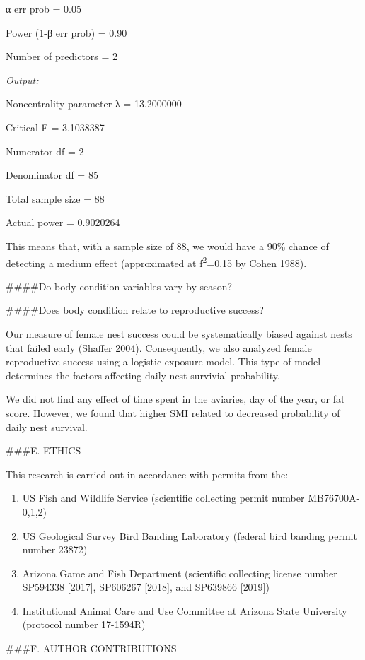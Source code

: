 \documentclass[
]{article}
\providecommand{\tightlist}{%
  \setlength{\itemsep}{0pt}\setlength{\parskip}{0pt}}
\begin{document}
α err prob = 0.05

Power (1-β err prob) = 0.90

Number of predictors = 2

\emph{Output:}

Noncentrality parameter λ = 13.2000000

Critical F = 3.1038387

Numerator df = 2

Denominator df = 85

Total sample size = 88

Actual power = 0.9020264

This means that, with a sample size of 88, we would have a 90\% chance
of detecting a medium effect (approximated at f\textsuperscript{2}=0.15
by Cohen 1988).

\#\#\#\#Do body condition variables vary by season?

\#\#\#\#Does body condition relate to reproductive success?

Our measure of female nest success could be systematically biased
against nests that failed early (Shaffer 2004). Consequently, we also
analyzed female reproductive success using a logistic exposure model.
This type of model determines the factors affecting daily nest survivial
probability.

We did not find any effect of time spent in the aviaries, day of the
year, or fat score. However, we found that higher SMI related to
decreased probability of daily nest survival.

\#\#\#E. ETHICS

This research is carried out in accordance with permits from the:

\begin{enumerate}
\def\labelenumi{\arabic{enumi})}
\tightlist
\item
  US Fish and Wildlife Service (scientific collecting permit number
  MB76700A-0,1,2)
\item
  US Geological Survey Bird Banding Laboratory (federal bird banding
  permit number 23872)
\item
  Arizona Game and Fish Department (scientific collecting license number
  SP594338 {[}2017{]}, SP606267 {[}2018{]}, and SP639866 {[}2019{]})
\item
  Institutional Animal Care and Use Committee at Arizona State
  University (protocol number 17-1594R)
\end{enumerate}

\#\#\#F. AUTHOR CONTRIBUTIONS
\end{document}
